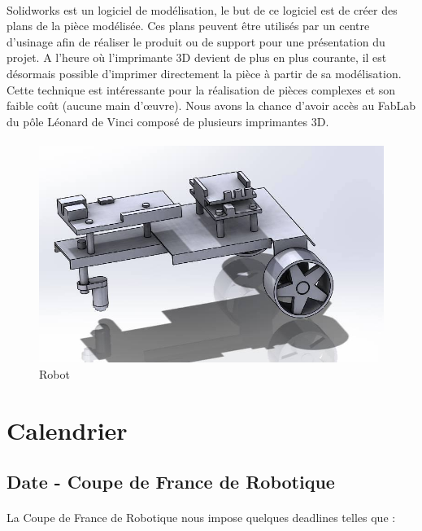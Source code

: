 \documentclass[12pt,a4paper]{article}
\begin{document}
\paragraph{}
Solidworks est un logiciel de modélisation, le but de ce logiciel est de
créer des plans de la pièce modélisée. Ces plans peuvent être utilisés par
un centre d'usinage afin de réaliser le produit ou de support pour une
présentation du projet. A l'heure où l'imprimante 3D devient de plus en
plus courante, il est désormais possible d'imprimer directement la pièce à
partir de sa modélisation. Cette technique est intéressante pour la
réalisation de pièces complexes et son faible coût (aucune main
d'œuvre). Nous avons la chance d'avoir accès au FabLab du pôle Léonard de
Vinci composé de plusieurs imprimantes 3D.

\paragraph{}

\begin{figure}[!h]
\centering
\includegraphics[width=12 cm]{img/robot_con.jpg}
\caption{Robot }
\end{figure}


\section{Calendrier}
\subsection{Date - Coupe de France de Robotique}
\paragraph{}
La Coupe de France de Robotique nous impose quelques deadlines telles que :
\end{document}
